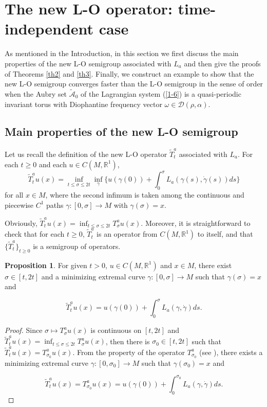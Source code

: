 \documentclass{amsart}[12pt]
\theoremstyle{definition}
\newtheorem{proposition}[theorem]{Proposition}
\theoremstyle{remark}
\numberwithin{equation}{section}
\begin{document}
\section{The new L-O operator: time-independent case}

As mentioned in the Introduction, in this section we first discuss
the main properties of the new L-O semigroup associated with $L_a$
and then give the proofs of Theorems \ref{th2} and \ref{th3}. Finally,
we construct an example to show that the new L-O semigroup converges
faster than the L-O semigroup in the sense of order when the Aubry set
 $\tilde{\mathcal{A}}_0$ of the Lagrangian system (\ref{1-6}) is a
quasi-periodic invariant torus with Diophantine frequency vector
$\omega\in\mathcal{D}(\rho,\alpha)$.

\subsection{Main properties of the new L-O semigroup}
Let us recall the definition of the new
L-O operator $\tilde{T}^a_t$ associated with $L_a$.
For each $t\geq0$ and each $u\in C(M,\mathbb{R}^1)$,
\[
\tilde{T}^a_tu(x)=\inf_{t\leq \sigma\leq
2t}\inf_{\gamma}\big\{u(\gamma(0))+\int_0^\sigma L_a(\gamma(s),\dot{\gamma}(s))ds\big\}
\]
for all $x\in M$, where the second infimum is taken among the
continuous and piecewise $C^1$ paths $\gamma:[0,\sigma]\rightarrow M$
with $\gamma(\sigma)=x$.

Obviously, $\tilde{T}^a_tu(x)=\inf_{t\leq \sigma\leq 2t}T^a_\sigma u(x)$. Moreover,
it is straightforward to check that for each $t\geq 0$, $\tilde{T}^a_t$ is an operator from
$C(M,\mathbb{R}^1)$ to itself, and that $\{\tilde{T}^a_t\}_{t\geq 0}$ is a semigroup of operators.

\begin{proposition}\label{pr4-1}
For given $t>0$, $u\in C(M,\mathbb{R}^1)$ and $x\in M$, there
exist $\sigma\in[t,2t]$ and a minimizing extremal curve $\gamma:[0,\sigma]\rightarrow
M$ such that $\gamma(\sigma)=x$ and

\[
\tilde{T}^a_tu(x)=u(\gamma(0))+\int_0^\sigma L_a(\gamma,\dot{\gamma})ds.
\]
\end{proposition}

\begin{proof}
Since $\sigma\mapsto T^a_\sigma u(x)$ is continuous on $[t,2t]$ and
$\tilde{T}^a_tu(x)=\inf_{t\leq \sigma\leq 2t}T^a_\sigma u(x)$, then there is
$\sigma_0\in[t,2t]$ such that $\tilde{T}^a_tu(x)=T^a_{\sigma_0}u(x)$. From
the property of the operator $T^a_{\sigma_0}$ (see
\cite [Lemma 4.4.1]{Fat-b}), there exists a minimizing extremal curve
$\gamma:[0,\sigma_0]\rightarrow M$ such that $\gamma(\sigma_0)=x$ and

\[
\tilde{T}^a_tu(x)=T^a_{\sigma_0}u(x)=u(\gamma(0))+\int_0^{\sigma_0}L_a(\gamma,\dot{\gamma})ds.
\]
\end{proof}
\end{document}
